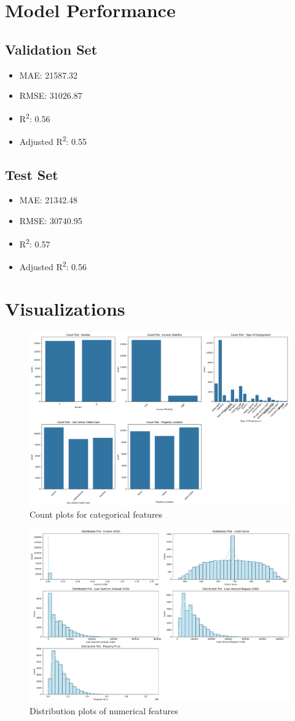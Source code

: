 \documentclass[12pt]{article}
\begin{document}
\section{Model Performance}
\subsection*{Validation Set}
\begin{itemize}
    \item MAE: 21587.32
    \item RMSE: 31026.87
    \item R\textsuperscript{2}: 0.56
    \item Adjusted R\textsuperscript{2}: 0.55
\end{itemize}

\subsection*{Test Set}
\begin{itemize}
    \item MAE: 21342.48
    \item RMSE: 30740.95
    \item R\textsuperscript{2}: 0.57
    \item Adjusted R\textsuperscript{2}: 0.56
\end{itemize}

\section{Visualizations}

\begin{figure}[H]
\centering
\includegraphics[width=0.65\linewidth]{images/count_plots.png}
\caption{Count plots for categorical features}
\end{figure}

\begin{figure}[H]
\centering
\includegraphics[width=0.65\linewidth]{images/distribution_plots.png}
\caption{Distribution plots of numerical features}
\end{figure}
\end{document}
